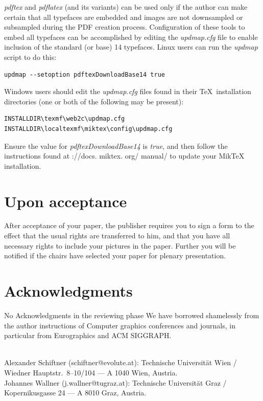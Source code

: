 \documentclass[twoside]{article}
\begin{document}
{\em pdftex} and {\em pdflatex} (and its variants) can be used only if the 
author can make certain that all typefaces are embedded and images are not 
downsampled or subsampled during the PDF creation process. Configuration 
of these tools to embed all typefaces can be accomplished by editing the 
{\em updmap.cfg} file to enable inclusion of the standard (or base) 14 
typefaces. Linux users can run the {\em updmap} script to do this:

{\footnotesize\begin{verbatim} 
updmap --setoption pdftexDownloadBase14 true 
\end{verbatim}}

Windows users should edit the {\em updmap.cfg} files found in their \TeX\ 
installation directories (one or both of the following may be present):

{\footnotesize\begin{verbatim}
INSTALLDIR\texmf\web2c\updmap.cfg
INSTALLDIR\localtexmf\miktex\config\updmap.cfg
\end{verbatim}}

Ensure the value for {\em pdftexDownloadBase14} is {\em true}, and then 
follow the instructions found at {\http://docs. miktex. org/ manual/} to 
update your MikTeX installation.


\section{Upon acceptance}

After acceptance of your paper, the publisher requires you to sign a form 
to the effect that the usual rights are transferred to him, and that you 
have all necessary rights to include your pictures in the paper. Further 
you will be notified if the chairs have selected your paper for plenary 
presentation.

\section*{Acknowledgments}

\ifreviewing
No Acknowledgments in the reviewing phase
\else
We have borrowed shamelessly from the author instructions of Computer 
graphics conferences and journals, in particular from Eurographics and ACM 
SIGGRAPH.
\fi

\nocite{*} %


\ifreviewing\else\vfill

 \\[1ex]
Alexander Schiftner (schiftner@evolute.at):
Technische Universit\"at Wien / 
Wiedner Hauptstr.\ 8--10/104 --- A 1040 Wien, Austria. \\
Johannes Wallner (j.wallner@tugraz.at):
Technische Universit\"at Graz / 
Kopernikusgasse 24 --- A 8010 Graz, Austria.\fi
\end{document}
